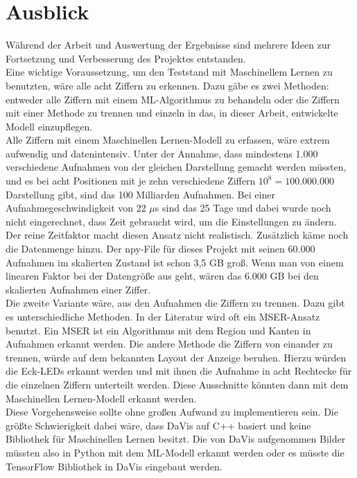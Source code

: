 \section{Ausblick} \label{Kapitel: Ausblick}
Während der Arbeit und Auswertung der Ergebnisse sind mehrere Ideen zur Fortsetzung  und Verbesserung des Projektes entstanden.\\
Eine wichtige Voraussetzung, um den Teststand mit Maschinellem Lernen zu benutzten, wäre alle acht Ziffern zu erkennen.  Dazu gäbe es zwei Methoden: entweder alle Ziffern mit einem ML-Algorithmus zu behandeln oder die Ziffern mit einer Methode zu trennen und einzeln in das, in dieser Arbeit,  entwickelte Modell einzupflegen.\\
Alle Ziffern mit einem Maschinellen Lernen-Modell zu erfassen, wäre extrem aufwendig und datenintensiv.  Unter der Annahme, dass mindestens 1.000 verschiedene Aufnahmen von der gleichen Darstellung gemacht werden müssten, und es bei acht Positionen mit je zehn verschiedene Ziffern $10^{8}= 100.000.000$ Darstellung gibt, sind das 100 Milliarden  Aufnahmen.  Bei einer Aufnahmegeschwindigkeit von 22 $\mu$s sind das 25 Tage und dabei wurde noch nicht eingerechnet, dass Zeit gebraucht wird, um die Einstellungen zu ändern. Der reine Zeitfaktor macht diesen Ansatz nicht realistisch. Zusätzlich käme noch die Datenmenge hinzu.  Der npy-File für dieses Projekt mit seinen 60.000 Aufnahmen im skalierten Zustand ist schon 3,5 GB groß.  Wenn man von einem linearen Faktor bei der Datengröße aus geht, wären das 6.000 GB bei den skalierten Aufnahmen einer Ziffer.\\
Die zweite Variante wäre, aus den Aufnahmen die Ziffern zu trennen. Dazu gibt es unterschiedliche Methoden. In der Literatur wird oft ein MSER-Ansatz benutzt.  Ein MSER ist ein Algorithmus mit dem Region und Kanten in Aufnahmen erkannt werden.
Die andere Methode die Ziffern von einander zu trennen, würde auf dem bekannten Layout der Anzeige beruhen.  Hierzu würden die Eck-LEDs erkannt werden und mit ihnen die Aufnahme in acht Rechtecke für die einzelnen Ziffern unterteilt werden. Diese Ausschnitte könnten dann mit dem Maschinellen Lernen-Modell erkannt werden.\\
Diese Vorgehensweise sollte ohne großen Aufwand zu implementieren sein.  Die größte Schwierigkeit dabei wäre,  dass DaVis auf C++ basiert und keine Bibliothek für Maschinellen Lernen besitzt. Die von DaVis aufgenommen Bilder müssten also in Python mit dem ML-Modell erkannt werden oder es müsste die TensorFlow Bibliothek in DaVis eingebaut werden.

